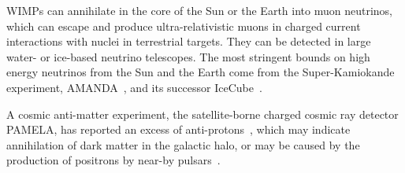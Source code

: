 WIMPs can annihilate in the core of the Sun or the Earth into muon neutrinos, which can escape and produce ultra-relativistic muons in charged current interactions with nuclei in terrestrial targets. They can be detected in large water- or ice-based neutrino telescopes. The most stringent bounds on high energy neutrinos from the Sun and the Earth come from the Super-Kamiokande~\cite{IndirectDetection_SuperK} experiment, AMANDA~\cite{IndirectDetection_AMANDA}, and its successor IceCube~\cite{IndirectDetection_IceCube}.

A cosmic anti-matter experiment, the satellite-borne charged cosmic ray detector PAMELA, has reported an excess of anti-protons~\cite{IndirectDetection_PAMELA1}, which may indicate annihilation of dark matter in the galactic halo, or may be caused by the production of positrons by near-by pulsars~\cite{IndirectDetection_PAMELA2}. 
